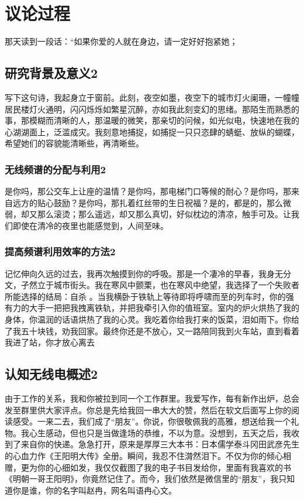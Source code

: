 \chapter{议论过程}

那天读到一段话：“如果你爱的人就在身边，请一定好好抱紧她；
\section{研究背景及意义2}
写下这句诗，我起身立于窗前。此刻，夜空如墨，夜空下的城市灯火阑珊，一幢幢居民楼灯火通明，闪闪烁烁如繁星沉醉，亦如我此刻变幻的思绪。那陌生而熟悉的事，那模糊而清晰的人，那温暖的微笑，那亲切的问候，如光似电，快速地在我的心湖湖面上，泛滥成灾。我刻意地捕捉，如捕捉一只只恣肆的蜻蜓、放纵的蝴蝶，希望她们的容貌能清晰些，再清晰些。
\subsection{无线频谱的分配与利用2}
是你吗，那公交车上让座的温情？是你吗，那电梯门口等候的耐心？是你吗，那来自远方的贴心鼓励？是你吗，那扎着红丝带的生日祝福？是的，都是的，那么微弱，却又那么滚烫；那么遥远，却又那么真切，好似枕边的清凉，触手可及。让我们即使在清冷的夜里也能感觉到，人间至味。
\subsection{提高频谱利用效率的方法2}
记忆伸向久远的过去，我再次触摸到你的呼吸。那是一个凄冷的早春，我身无分文，孑然立于城市街头。我在寒风中颤栗，也在寒风中绝望，我选择了一个失败者所能选择的结局：自杀 。当我横卧于铁轨上等待即将呼啸而至的列车时，你的强有力的大手一把把我拽离铁轨，并把我牵引入你的值班室。室内的炉火烘热了我的身体，你温润的话语烘热了我的心灵。我吃着你给我打来的饭菜，泪如雨下。你给了我五十块钱，劝我回家。最终你还是不放心，又一路陪同我到火车站，直到看着我进了站，你才放心离去
\section{认知无线电概述2}
由于工作的关系，我和你被拉到同一个工作群里。我爱写作，每有新作出炉，总会发至群里供大家评点。你总是先给我回一串大大的赞，然后在软文后面写上你的阅读感受。一来二去，我们成了“朋友”。你说，你很敬佩我的高雅，想送给我一个礼物。我心生感动，但也只是当做逢场的恭维，不以为意。没想到，五天之后，我收到了来自你的快递。急急打开，原来是厚厚三大本书：日本儒学泰斗冈田武彦先生的心血力作《王阳明大传》全册。瞬间，我忍不住潸然泪下。不仅为你的倾心相赠，更为你的心细如发，我仅仅截图了我的电子书目发给你，里面有我喜欢的书《明朝一哥王阳明》，你竟然记住了。而今，我们依然是微信里的“朋友”，我只知道你是谁，你的名字叫赵冉，网名叫语冉心文。
